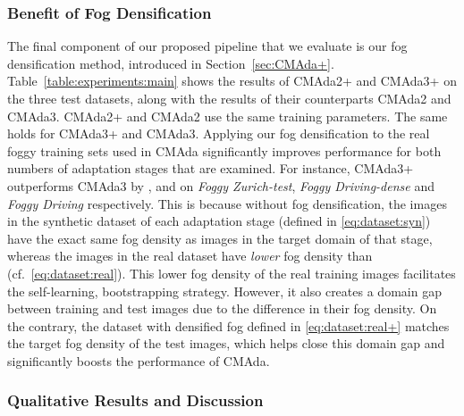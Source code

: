 \documentclass[twocolumn]{svjour3}          \smartqed  \usepackage{graphicx}
\begin{document}
\subsubsection{Benefit of Fog Densification}
\label{sec:benefit:fog:densification}

The final component of our proposed pipeline that we evaluate is our fog densification method, introduced in Section~\ref{sec:CMAda+}. Table~\ref{table:experiments:main} shows the results of CMAda2+ and CMAda3+ on the three test datasets, along with the results of their counterparts CMAda2 and CMAda3. CMAda2+ and CMAda2 use the same training parameters. The same holds for CMAda3+ and CMAda3.
Applying our fog densification to the real foggy training sets used in CMAda significantly improves performance for both numbers of adaptation stages that are examined. For instance, CMAda3+ outperforms CMAda3 by ,  and  on \emph{Foggy Zurich-test}, \emph{Foggy Driving-dense} and \emph{Foggy Driving} respectively.
This is because without fog densification, the images in the synthetic dataset  of each adaptation stage (defined in \eqref{eq:dataset:syn}) have the exact same fog density  as images in the target domain of that stage, whereas the images in the real dataset  have \emph{lower} fog density than  (cf.\ \eqref{eq:dataset:real}). This lower fog density of the real training images facilitates the self-learning, bootstrapping strategy. However, it also creates a domain gap between training and test images due to the difference in their fog density. On the contrary, the dataset with densified fog defined in \eqref{eq:dataset:real+} matches the target fog density of the test images, which helps close this domain gap and significantly boosts the performance of CMAda.

\subsubsection{Qualitative Results and Discussion}
\label{sec:qualitative:results}
\end{document}
